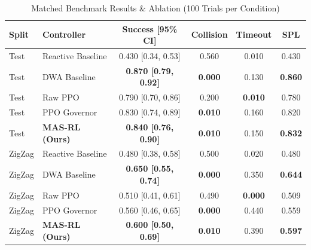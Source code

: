 \documentclass[conference]{IEEEtran}
\begin{document}
\begin{table}[h]
\centering
\caption{Matched Benchmark Results \& Ablation (100 Trials per Condition)}
\label{tab:ieee_results}
\scriptsize
\begin{tabular}{llcccc}
\toprule
\textbf{Split} & \textbf{Controller} & \textbf{Success [95\% CI]} & \textbf{Collision} & \textbf{Timeout} & \textbf{SPL} \\
\midrule
Test & Reactive Baseline & 0.430 [0.34, 0.53] & 0.560 & 0.010 & 0.430 \\
Test & DWA Baseline & \textbf{0.870 [0.79, 0.92]} & \textbf{0.000} & 0.130 & \textbf{0.860} \\
Test & Raw PPO & 0.790 [0.70, 0.86] & 0.200 & \textbf{0.010} & 0.780 \\
Test & PPO Governor & 0.830 [0.74, 0.89] & \textbf{0.010} & 0.160 & 0.820 \\
Test & \textbf{MAS-RL (Ours)} & \textbf{0.840 [0.76, 0.90]} & \textbf{0.010} & 0.150 & \textbf{0.832} \\
\midrule
ZigZag & Reactive Baseline & 0.480 [0.38, 0.58] & 0.500 & 0.020 & 0.480 \\
ZigZag & DWA Baseline & \textbf{0.650 [0.55, 0.74]} & \textbf{0.000} & 0.350 & \textbf{0.644} \\
ZigZag & Raw PPO & 0.510 [0.41, 0.61] & 0.490 & \textbf{0.000} & 0.509 \\
ZigZag & PPO Governor & 0.560 [0.46, 0.65] & \textbf{0.000} & 0.440 & 0.559 \\
ZigZag & \textbf{MAS-RL (Ours)} & \textbf{0.600 [0.50, 0.69]} & \textbf{0.010} & 0.390 & \textbf{0.597} \\
\bottomrule
\end{tabular}
\end{table}
\end{document}

